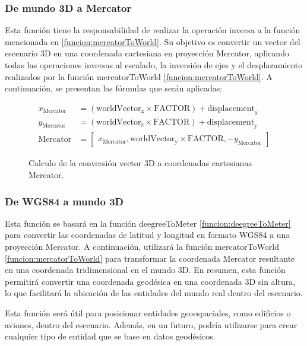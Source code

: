 \documentclass[a4paper, 11pt]{book}
\begin{document}
\subsubsection{De mundo 3D a Mercator}
\label{funcion:worldtoMercator}
Esta función tiene la responsabilidad de realizar la operación inversa a la función mencionada en \ref{funcion:mercatorToWorld}. Su objetivo es convertir un vector del escenario 3D en una coordenada cartesiana en proyección Mercator, aplicando todas las operaciones inversas al escalado, la inversión de ejes y el desplazamiento realizados por la función mercatorToWorld \ref{funcion:mercatorToWorld}. A continuación, se presentan las fórmulas que serán aplicadas:

\begin{figure}[H]
\begin{align*}
x_{\text{Mercator}} &= (\mathbf{\mathrm{worldVector}}_{\text{x}} \times \mathbf{\mathrm{FACTOR}}) + \mathbf{\mathrm{displacement}}_{\text{x}} \\
y_{\text{Mercator}} &= (\mathbf{\mathrm{worldVector}}_{\text{z}} \times \mathbf{\mathrm{FACTOR}}) + \mathbf{\mathrm{displacement}}_{\text{y}} \\
\mathbf{\mathrm{Mercator}} &= 
\begin{bmatrix}
x_{\text{Mercator}}, \mathbf{\mathrm{worldVector}}_{\text{y}} \times \mathbf{\mathrm{FACTOR}}, -y_{\text{Mercator}}
\end{bmatrix}
\end{align*}
\caption{Calculo de la conversión vector 3D a coordenadas cartesianas Mercator.}
  \label{formula:worldtoMercator}
\end{figure}

\subsubsection{De WGS84 a mundo 3D}
\label{funcion:degreeToWorld}
Esta función se basará en la función deegreeToMeter \ref{funcion:deegreeToMeter} para convertir las coordenadas de latitud y longitud en formato WGS84 a una proyección Mercator. A continuación, utilizará la función mercatorToWorld  \ref{funcion:mercatorToWorld} para transformar la coordenada Mercator resultante en una coordenada tridimensional en el mundo 3D. En resumen, esta función permitirá convertir una coordenada geodésica en una coordenada 3D sin altura, lo que facilitará la ubicación de las entidades del mundo real dentro del escenario.

Esta función será útil para posicionar entidades geoespaciales, como edificios o aviones, dentro del escenario. Además, en un futuro, podría utilizarse para crear cualquier tipo de entidad que se base en datos geodésicos.
\end{document}
